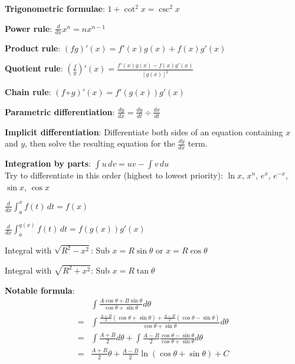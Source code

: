\documentclass[a4paper,landscape]{article}
\newcommand{\rnname}[1]{\textbf{#1}}
\begin{document}
\begin{multicols*}{3}
\begin{flatitemize}
\item \rnname{Trigonometric formulae}: $1 + \cot^2 x = \csc^2 x$

\item \rnname{Power rule}: $\displaystyle \frac{d}{dx}x^n = nx^{n-1}$
\item \rnname{Product rule}: $\displaystyle (fg)'(x) = f'(x)g(x) + f(x)g'(x)$
\item \rnname{Quotient rule}: $\displaystyle \left(\frac{f}{g}\right)'(x) = \frac{f'(x)g(x) - f(x)g'(x)}{\left[g(x)\right]^2}$
\item \rnname{Chain rule}: $\displaystyle (f \circ g)'(x) = f'(g(x))g'(x)$
\item \rnname{Parametric differentiation}: $\displaystyle \frac{dy}{dx} = \frac{dy}{dt}\div\frac{dx}{dt}$
\item \rnname{Implicit differentiation}: Differentiate both sides of an equation containing $x$ and $y$, then solve the resulting equation for the $\displaystyle\frac{dy}{dx}$ term.

\item \rnname{Integration by parts}: $\displaystyle \int u\,dv = uv - \int v\,du$ \\
Try to differentiate in this order (highest to lowest priority): $\ln x$, $x^n$, $e^x$, $e^{-x}$, $\sin x$, $\cos x$

\item $\displaystyle \frac{d}{dx} \int_a^x f \left( t \right) \, dt = f \left( x \right)$
\item $\displaystyle \frac{d}{dx} \int_a^{g\left(x\right)} f \left( t \right) \, dt = f \left( g\left(x\right) \right)g' \left( x \right)$
\item Integral with $\sqrt{R^2-x^2}$: Sub $x=R\sin\theta$ or $x=R\cos\theta$
\item Integral with $\sqrt{R^2+x^2}$: Sub $x=R\tan\theta$
\item \rnname{Notable formula}:
\begin{align*}
&\int \frac{A \cos \theta + B \sin \theta}{\cos \theta + \sin \theta} d \theta \\ = &\int \frac{\frac{A+B}{2} \left( \cos \theta + \sin \theta \right) + \frac{A-B}{2} \left( \cos \theta - \sin \theta \right) }{\cos \theta + \sin \theta} d \theta \\ = &\int \frac{A+B}{2}  d \theta + \int \frac{A-B}{2} \frac{ \cos \theta - \sin \theta }{\cos \theta + \sin \theta} d \theta \\ = &\frac{A+B}{2} \theta + \frac{A-B}{2} \ln \left(\cos \theta + \sin \theta\right) + C
\end{align*}
\end{flatitemize}


\end{multicols*}
\end{document}
